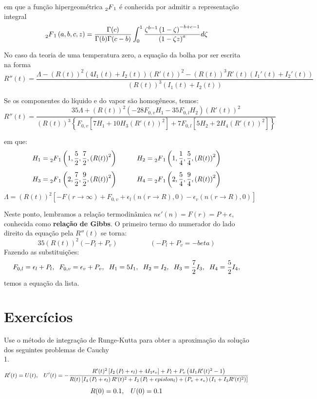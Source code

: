 \documentclass[10pt,a4paper]{article}
\newcommand{\prt}[1]{\left(#1\right)}
\newcommand{\col}[1]{\left[#1\right]}
\newcommand{\chv}[1]{\left\{#1\right\}}
\newcommand{\hgf}[4]{\prescript{}{2}{F}_1\left(#1,#2,#3,#4\right)}
\begin{document}
	em que a função hipergeométrica $\prescript{}{2}{F}_1$ é conhecida por admitir a representação integral
	\[\hgf{a}{b}{c}{z} = \frac{\Gamma(c)}{\Gamma(b)\Gamma(c-b)}\int_0^1{\frac{\zeta^{b-1}\prt{1-\zeta}^{-b+c-1}}{\prt{1-\zeta z}^a}d\zeta}\]
	
	No caso da teoria de uma temperatura zero, a equação da bolha por ser escrita na forma
	\[R''(t) = \frac{\Lambda-\prt{R(t)}^2\prt{4I_1(t)+I_2(t)}\prt{R'(t)}^2-\prt{R(t)}^3R'(t)\prt{I_1'(t)+I_2'(t)}}{\prt{R(t)}^3\prt{I_1(t)+I_2(t)}}\]
	
	Se os componentes do líquido e do vapor são homogêneos, temos:
	\[R''(t) = \frac{35\Lambda + \prt{R(t)}^2\prt{-28F_{0,v}H_1-35F_{0,l}H_2}\prt{R'(t)}^2}{\prt{R(t)}^3\chv{F_{0,v}\col{7H_1+10H_3\prt{R'(t)}^2}+7F_{0,l}\col{5H_2+2H_4\prt{R'(t)}^2}}}\]
	
	em que:
	\[H_1 = \hgf{1}{\frac{5}{2}}{\frac{7}{2}}{\prt{R(t)}^2} \hspace{1cm} H_2 = \hgf{1}{\frac{1}{4}}{\frac{5}{4}}{\prt{R(t)}^2}\]
	\[H_3 = \hgf{2}{\frac{7}{2}}{\frac{9}{2}}{\prt{R(t)}^2} \hspace{1cm} H_4 = \hgf{2}{\frac{5}{4}}{\frac{9}{4}}{\prt{R(t)}^2}\]
	\[\Lambda = \prt{R(t)}^2\col{-F(r\rightarrow\infty) + F_{0,v} + \epsilon_l(n(r\rightarrow R),0) - \epsilon_v(n(r\rightarrow R),0)}\]
	
	Neste ponto, lembramos a relação termodinâmica $n\epsilon'(n)=F(r)=P+\epsilon$, conhecida como \textbf{relação de Gibbs}. O primeiro termo do numerador do lado direito da equação pela $R''(t)$ se torna:
	\[35\prt{R(t)}^2\prt{-P_l+P_v}\hspace{2cm}(-P_l+P_v=-beta)\]
	Fazendo as substituições:
	\[F_{0,l}=\epsilon_l+P_l, \hspace{.2cm} F_{0,v}=\epsilon_v+P_v, \hspace{.2cm} H_1=5I_1, \hspace{.2cm} H_2=I_2, \hspace{.2cm} H_3=\frac{7}{2}I_3,\hspace{.2cm}  H_4=\frac{5}{2}I_4,\]
	temos a equação da lista.
	
	\section{Exercícios}
	Use o método de integração de Runge-Kutta para obter a aproximação da solução dos seguintes problemas de Cauchy\\
	
	1. \[R'(t)=U(t), \hspace{0.3cm} U'(t)=-\frac{R'(t)^2\col{I_2\prt{P_l+\epsilon_l} + 4I_1\epsilon_v}+P_l+P_v\prt{4I_1R'(t)^2-1}}{R(t)\col{I_4\prt{P_l+\epsilon_l}R'(t)^2+I_2\prt{P_l+epislon_l}+\prt{P_v+\epsilon_v}\prt{I_1+I_3R'(t)^2}}}\]
	\[R(0)=0.1, \hspace{.3cm} U(0)=0.1\]
	
\end{document}
